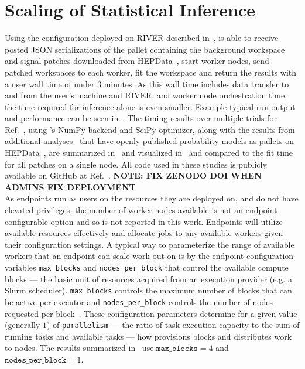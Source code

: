 \section{Scaling of Statistical Inference}\label{sec:results}
%
Using the \funcX{} configuration deployed on RIVER described in~, \funcX{} is able to receive posted JSON serializations of the \pyhf{} pallet containing the background workspace and signal patches downloaded from HEPData~\cite{ATLAS_SUSY_1Lbb_pallet}, start \funcX{} worker nodes, send patched workspaces to each worker, fit the workspace and return the results with a user wall time of under 3 minutes.
As this wall time includes data transfer to and from the user's machine and RIVER, and worker node orchestration time, the time required for inference alone is even smaller.
Example typical run output and performance can be seen in~.
The timing results over multiple trials for Ref.~\cite{ATLAS_SUSY_1Lbb_pallet}, using \pyhf{}'s NumPy backend and SciPy optimizer, along with the results from additional analyses~\cite{SUSY-2018-09,SUSY-2018-04} that have openly published probability models as \pyhf{} pallets on HEPData~\cite{ATLAS_SUSY_SS3L_pallet,ATLAS_SUSY_staus_pallet}, are summarized in~ and visualized in~ and compared to the fit time for all patches on a single node.
All code used in these studies is publicly available on GitHub at Ref.~\cite{study_code,study_code_zenodo_doi}.
\textbf{NOTE: FIX ZENODO DOI WHEN ADMINS FIX DEPLOYMENT}\\

As \funcX{} endpoints run as users on the resources they are deployed on, and do not have elevated privileges, the number of worker nodes available is not an endpoint configurable option and so is not reported in this work.
Endpoints will utilize available resources effectively and allocate jobs to any available workers given their configuration settings.
A typical way to parameterize the range of available workers that an endpoint can scale work out on is by the \funcX{} endpoint configuration variables \texttt{max\_blocks} and \texttt{nodes\_per\_block} that control the available compute blocks --- the basic unit of resources acquired from an execution provider (e.g. a Slurm scheduler).
\texttt{max\_blocks} controls the maximum number of blocks that can be active per \funcX{} executor and \texttt{nodes\_per\_block} controls the number of nodes requested per block~\cite{Parsl_paper}.
These configuration parameters determine for a given value (generally $1$) of \texttt{parallelism} --- the ratio of task execution capacity to the sum of running tasks and available tasks --- how \funcX{} provisions blocks and distributes work to nodes.
The results summarized in~ use $\texttt{max\_blocks}=4$ and $\texttt{nodes\_per\_block}=1$.
\clearpage

